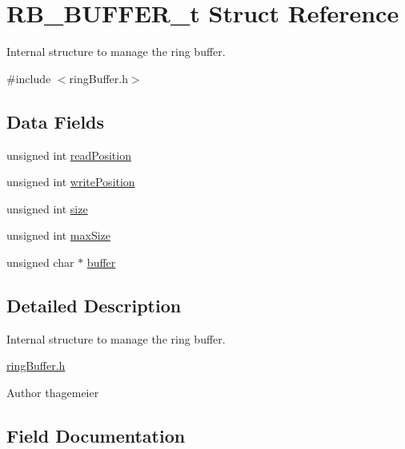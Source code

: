 \hypertarget{struct_r_b___b_u_f_f_e_r__t}{}\section{R\+B\+\_\+\+B\+U\+F\+F\+E\+R\+\_\+t Struct Reference}
\label{struct_r_b___b_u_f_f_e_r__t}


Internal structure to manage the ring buffer.  




{\ttfamily \#include $<$ring\+Buffer.\+h$>$}

\subsection*{Data Fields}
\begin{DoxyCompactItemize}
\item 
unsigned int \hyperlink{struct_r_b___b_u_f_f_e_r__t_adfe0cf8a3027c978673610daf637f2fe}{read\+Position}
\item 
unsigned int \hyperlink{struct_r_b___b_u_f_f_e_r__t_a102e260ea62241f6600bcd8ca328f120}{write\+Position}
\item 
unsigned int \hyperlink{struct_r_b___b_u_f_f_e_r__t_aac913b3a1f6ef005d66bf7a84428773e}{size}
\item 
unsigned int \hyperlink{struct_r_b___b_u_f_f_e_r__t_ab30b7ceceef441edd501b3fdec0e63d7}{max\+Size}
\item 
unsigned char $\ast$ \hyperlink{struct_r_b___b_u_f_f_e_r__t_a70e7ad2e1a45c8db5fba9ad4778bd400}{buffer}
\end{DoxyCompactItemize}


\subsection{Detailed Description}
Internal structure to manage the ring buffer. 

\hyperlink{ring_buffer_8h_source}{ring\+Buffer.\+h}

\begin{DoxyAuthor}{Author}
thagemeier 
\end{DoxyAuthor}


\subsection{Field Documentation}
\mbox{\label{struct_r_b___b_u_f_f_e_r__t_a70e7ad2e1a45c8db5fba9ad4778bd400}} 
